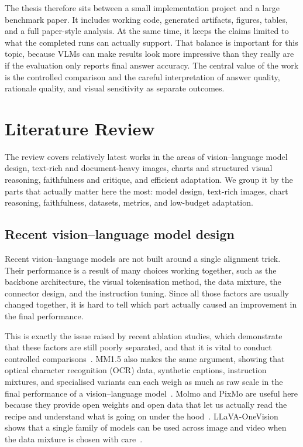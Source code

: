 \documentclass[12pt,bibliography=totoc,listof=totoc,BCOR=5mm,DIV=12,oneside,open=any]{scrbook}
\let\cite\citep
\begin{document}
The thesis therefore sits between a small implementation project and a large benchmark paper.
It includes working code, generated artifacts, figures, tables, and a full paper-style analysis.
At the same time, it keeps the claims limited to what the completed runs can actually support.
That balance is important for this topic, because VLMs can make results look more impressive than they really are if the evaluation only reports final answer accuracy.
The central value of the work is the controlled comparison and the careful interpretation of answer quality, rationale quality, and visual sensitivity as separate outcomes.

\chapter{Literature Review}
The review covers relatively latest works in the areas of vision--language model design,
text-rich and document-heavy images, charts and structured visual reasoning, faithfulness and critique, and efficient adaptation.
We group it by the parts that actually matter here the most: model design, text-rich images, chart reasoning, faithfulness, datasets, metrics, and low-budget adaptation.

\section{Recent vision--language model design}
Recent vision--language models are not built around a single alignment trick.
Their performance is a result of many choices working together, such as the backbone architecture,
the visual tokenisation method, the data mixture, the connector design, and the instruction tuning.
Since all those factors are usually changed together, it is hard to tell which part actually caused an improvement in the final performance.

This is exactly the issue raised by recent ablation studies, 
which demonstrate that these factors are still poorly separated, and that it is vital to conduct controlled comparisons~\cite{laurencon2024whatmatters}.
MM1.5 also makes the same argument, showing that optical character recognition (OCR) data,
synthetic captions, instruction mixtures, and specialised variants 
can each weigh as much as raw scale in the final performance of a vision--language model~\cite{zhang2025mm15}.
Molmo and PixMo are useful here because they provide open weights and open data 
that let us actually read the recipe and understand what is going on under the hood~\cite{deitke2025molmo}.
LLaVA-OneVision shows that a single family of models can be used across image and video when the data mixture is chosen with care~\cite{li2025llavaonevision}.
\end{document}
